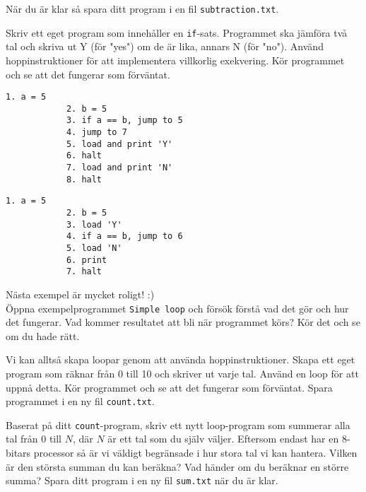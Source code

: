 \begin{Datorarbete}
    När du är klar så spara ditt program i en fil \texttt{subtraction.txt}.

    \item {} Skriv ett eget program som innehåller en \texttt{if}-sats. Programmet ska jämföra två tal och skriva ut Y (för "yes") om de är lika, annars N (för "no"). Använd hoppinstruktioner för att implementera villkorlig exekvering. Kör programmet och se att det fungerar som förväntat.

    \begin{minipage}[t]{0.42\textwidth}
        \begin{lstlisting}[xleftmargin=-15mm]
            1. a = 5
            2. b = 5
            3. if a == b, jump to 5
            4. jump to 7
            5. load and print 'Y'
            6. halt
            7. load and print 'N'
            8. halt
        \end{lstlisting}
    \end{minipage}
    \begin{minipage}[t]{0.42\textwidth}
        \begin{lstlisting}[xleftmargin=-15mm]
            1. a = 5
            2. b = 5
            3. load 'Y'
            4. if a == b, jump to 6
            5. load 'N'
            6. print
            7. halt
        \end{lstlisting}
    \end{minipage}

    \item {} Nästa exempel är mycket roligt! :) \\
    Öppna exempelprogrammet \texttt{Simple loop} och försök förstå vad det gör och hur det fungerar. Vad kommer resultatet att bli när programmet körs? Kör det och se om du hade rätt.

    \item {} Vi kan alltså skapa loopar genom att använda hoppinstruktioner. Skapa ett eget program som räknar från 0 till 10 och skriver ut varje tal. Använd en loop för att uppnå detta. Kör programmet och se att det fungerar som förväntat. Spara programmet i en ny fil \texttt{count.txt}.
    
    \item {} Baserat på ditt \texttt{count}-program, skriv ett nytt loop-program som summerar alla tal från 0 till \(N\), där \(N\) är ett tal som du själv väljer. Eftersom \progname{} endast har en 8-bitars processor så är vi väldigt begränsade i hur stora tal vi kan hantera. Vilken är den största summan du kan beräkna? Vad händer om du beräknar en större summa? Spara ditt program i en ny fil \texttt{sum.txt} när du är klar.
\end{Datorarbete}


